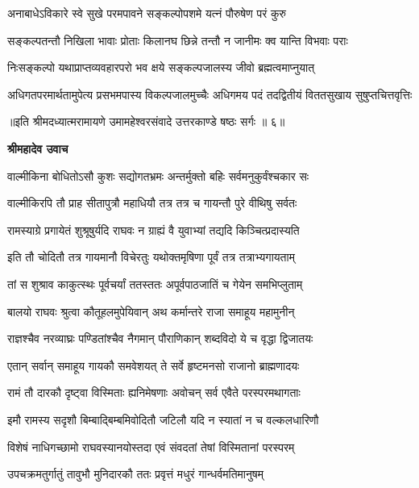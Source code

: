 \twolineshloka
{अनाबाधेऽविकारे स्वे सुखे परमपावने}
{सङ्कल्पोपशमे यत्नं पौरुषेण परं कुरु} %

\twolineshloka
{सङ्कल्पतन्तौ निखिला भावाः प्रोताः किलानघ}
{छिन्ने तन्तौ न जानीमः क्व यान्ति विभवाः पराः} %

\twolineshloka
{निःसङ्कल्पो यथाप्राप्तव्यवहारपरो भव}
{क्षये सङ्कल्पजालस्य जीवो ब्रह्मत्वमाप्नुयात्} %

\twolineshloka
{अधिगतपरमार्थतामुपेत्य प्रसभमपास्य विकल्पजालमुच्चैः}
{अधिगमय पदं तदद्वितीयं विततसुखाय सुषुप्तचित्तवृत्तिः} %

{॥इति श्रीमदध्यात्मरामायणे उमामहेश्वरसंवादे उत्तरकाण्डे षष्ठः
सर्गः ॥ ६॥
}




\textbf{श्रीमहादेव उवाच}

\twolineshloka
{वाल्मीकिना बोधितोऽसौ कुशः सद्योगतभ्रमः}
{अन्तर्मुक्तो बहिः सर्वमनुकुर्वंश्चकार सः} %

\twolineshloka
{वाल्मीकिरपि तौ प्राह सीतापुत्रौ महाधियौ}
{तत्र तत्र च गायन्तौ पुरे वीथिषु सर्वतः} %

\twolineshloka
{रामस्याग्रे प्रगायेतं शुश्रूषुर्यदि राघवः}
{न ग्राह्यं वै युवाभ्यां तद्यदि किञ्चित्प्रदास्यति} %

\twolineshloka
{इति तौ चोदितौ तत्र गायमानौ विचेरतुः}
{यथोक्तमृषिणा पूर्वं तत्र तत्राभ्यगायताम्} %

\twolineshloka
{तां स शुश्राव काकुत्स्थः पूर्वचर्यां ततस्ततः}
{अपूर्वपाठजातिं च गेयेन समभिप्लुताम्} %

\twolineshloka
{बालयो राघवः श्रुत्वा कौतूहलमुपेयिवान्}
{अथ कर्मान्तरे राजा समाहूय महामुनीन्} %

\twolineshloka
{राज्ञश्चैव नरव्याघ्रः पण्डितांश्चैव नैगमान्}
{पौराणिकान् शब्दविदो ये च वृद्धा द्विजातयः} %

\twolineshloka
{एतान् सर्वान् समाहूय गायकौ समवेशयत्}
{ते सर्वे हृष्टमनसो राजानो ब्राह्मणादयः} %

\twolineshloka
{रामं तौ दारकौ दृष्ट्वा विस्मिताः ह्यनिमेषणाः}
{अवोचन् सर्व एवैते परस्परमथागताः} %

\twolineshloka
{इमौ रामस्य सदृशौ बिम्बाद्बिम्बमिवोदितौ}
{जटिलौ यदि न स्यातां न च वल्कलधारिणौ} %

\twolineshloka
{विशेषं नाधिगच्छामो राघवस्यानयोस्तदा}
{एवं संवदतां तेषां विस्मितानां परस्परम्} %

\twolineshloka
{उपचक्रमतुर्गातुं तावुभौ मुनिदारकौ}
{ततः प्रवृत्तं मधुरं गान्धर्वमतिमानुषम्} %

